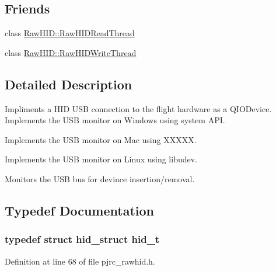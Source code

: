 \subsection*{\-Friends}
\begin{DoxyCompactItemize}
\item 
class \hyperlink{group___raw_h_i_d_plugin_ga8ff6a2bdea09543bed5912710ec13dab}{\-Raw\-H\-I\-D\-::\-Raw\-H\-I\-D\-Read\-Thread}
\item 
class \hyperlink{group___raw_h_i_d_plugin_ga2d3d87c46461ab8d3746b207989bb7f8}{\-Raw\-H\-I\-D\-::\-Raw\-H\-I\-D\-Write\-Thread}
\end{DoxyCompactItemize}


\subsection{\-Detailed \-Description}
\-Impliments a \-H\-I\-D \-U\-S\-B connection to the flight hardware as a \-Q\-I\-O\-Device. \-Implements the \-U\-S\-B monitor on \-Windows using system \-A\-P\-I.

\-Implements the \-U\-S\-B monitor on \-Mac using \-X\-X\-X\-X\-X.

\-Implements the \-U\-S\-B monitor on \-Linux using libudev.

\-Monitors the \-U\-S\-B bus for devince insertion/removal. 

\subsection{\-Typedef \-Documentation}
\hypertarget{group___raw_h_i_d_plugin_gace038be945e544c81ea45cabfb08655b}{
\subsubsection[{hid\-\_\-t}]{\setlength{\rightskip}{0pt plus 5cm}typedef struct {\bf hid\-\_\-struct} {\bf hid\-\_\-t}}}\label{group___raw_h_i_d_plugin_gace038be945e544c81ea45cabfb08655b}


\-Definition at line 68 of file pjrc\-\_\-rawhid.\-h.



